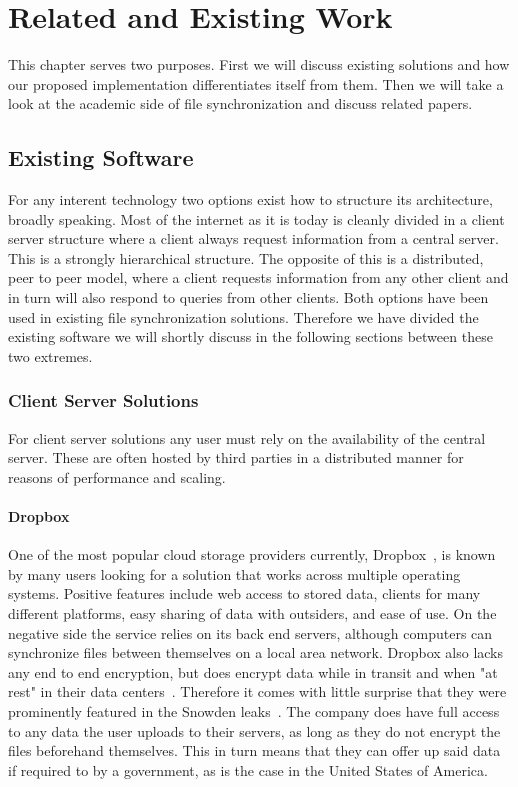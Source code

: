 \chapter{Related and Existing Work}
\label{chap:Related and Existing Work}

This chapter serves two purposes.
First we will discuss existing solutions and how our proposed implementation differentiates itself from them.
Then we will take a look at the academic side of file synchronization and discuss related papers.

\section{Existing Software}

For any interent technology two options exist how to structure its architecture, broadly speaking.
Most of the internet as it is today is cleanly divided in a client server structure where a client always request information from a central server.
This is a strongly hierarchical structure.
The opposite of this is a distributed, peer to peer model, where a client requests information from any other client and in turn will also respond to queries from other clients.
Both options have been used in existing file synchronization solutions.
Therefore we have divided the existing software we will shortly discuss in the following sections between these two extremes.

\subsection{Client Server Solutions}

For client server solutions any user must rely on the availability of the central server.
These are often hosted by third parties in a distributed manner for reasons of performance and scaling.

\subsubsection{Dropbox}

One of the most popular cloud storage providers currently, Dropbox~\cite{web:site:dropbox}, is known by many users looking for a solution that works across multiple operating systems.
Positive features include web access to stored data, clients for many different platforms, easy sharing of data with outsiders, and ease of use.
On the negative side the service relies on its back end servers, although computers can synchronize files between themselves on a local area network.
Dropbox also lacks any end to end encryption, but does encrypt data while in transit and when "at rest" in their data centers~\cite{web:site:dropbox:blog}.
Therefore it comes with little surprise that they were prominently featured in the Snowden leaks~\cite{web:site:rt:dropbox}.
The company does have full access to any data the user uploads to their servers, as long as they do not encrypt the files beforehand themselves.
This in turn means that they can offer up said data if required to by a government, as is the case in the United States of America.

